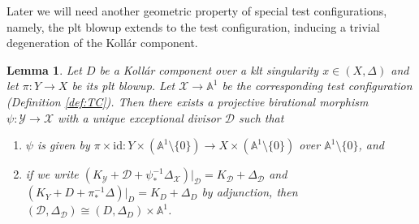 \documentclass[12pt]{amsart}
\newtheorem{lem}[prop]{Lemma}
\theoremstyle{definition}
\newcommand{\bA}{\mathbb{A}}
\newcommand{\scX}{\mathscr{X}}
\newcommand{\scY}{\mathscr{Y}}
\newcommand{\scD}{\mathscr{D}}
\numberwithin{equation}{section}
\begin{document}
Later we will need another geometric property of special test configurations, namely, the plt blowup extends to the test configuration, inducing a trivial degeneration of the Koll\'ar component.

\begin{lem} \label{lem:tc trivial on kollar comp}
Let $D$ be a Koll\'ar component over a klt singularity $x\in (X,\Delta)$ and let $\pi\colon Y\to X$ be its plt blowup. Let $\scX\to \bA^1$ be the corresponding test configuration (Definition \ref{def:TC}). Then there exists a projective birational morphism $\psi\colon \scY\to \scX$ with a unique exceptional divisor $\scD$ such that 
\begin{enumerate}
    \item $\psi$ is given by $\pi \times \mathrm{id}\colon Y\times (\bA^1\setminus\{0\})\to X \times (\bA^1\setminus\{0\})$ over $\bA^1\setminus\{0\}$, and
    \item if we write $(K_{\scY} + \scD + \psi_*^{-1}\Delta_{\scX})|_{\scD} = K_{\scD} + \Delta_{\scD}$ and $(K_Y + D + \pi_*^{-1}\Delta)|_D = K_D + \Delta_D$ by adjunction, then $(\scD, \Delta_{\scD})\cong (D, \Delta_D) \times \bA^1$.
\end{enumerate}
\end{lem}
\end{document}
